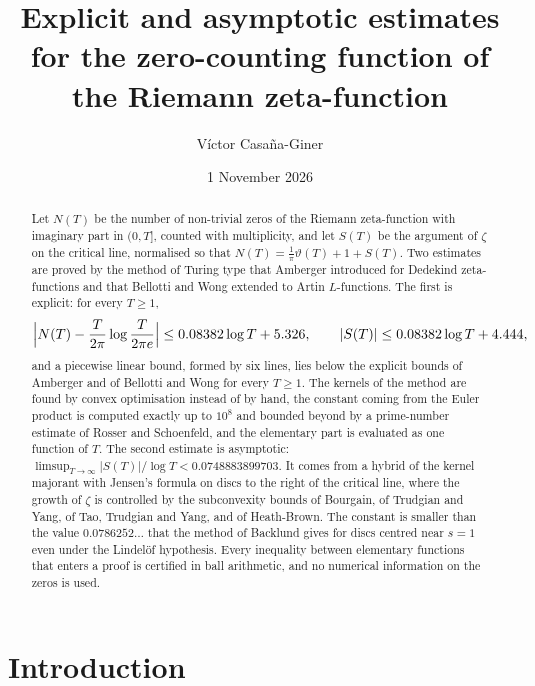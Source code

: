 \documentclass[11pt,reqno]{amsart}
\title[Explicit and asymptotic estimates for $N(T)$]{Explicit and asymptotic estimates for the zero-counting function of the Riemann zeta-function}
\author{V\'ictor Casa\~na-Giner}
\date{1 November 2026}
\numberwithin{equation}{section}
\theoremstyle{definition}
\theoremstyle{remark}
\newcommand{\LineBAone}{0.08382}
\newcommand{\LineBAthreeN}{5.326}
\newcommand{\LineBAthreeS}{4.444}
\newcommand{\CHup}{0.0748883899703}
\begin{document}
\begin{abstract}
Let $N(T)$ be the number of non-trivial zeros of the Riemann zeta-function with imaginary part in $(0,T]$, counted with multiplicity, and let $S(T)$ be the argument of $\zeta$ on the critical line, normalised so that $N(T)=\frac1\pi\vartheta(T)+1+S(T)$. Two estimates are proved by the method of Turing type that Amberger introduced for Dedekind zeta-functions and that Bellotti and Wong extended to Artin $L$-functions. The first is explicit: for every $T\ge1$,
\[
\Bigl|N(T)-\frac T{2\pi}\log\frac T{2\pi e}\Bigr|\le\LineBAone\log T+\LineBAthreeN,\qquad |S(T)|\le\LineBAone\log T+\LineBAthreeS,
\]
and a piecewise linear bound, formed by six lines, lies below the explicit bounds of Amberger and of Bellotti and Wong for every $T\ge1$. The kernels of the method are found by convex optimisation instead of by hand, the constant coming from the Euler product is computed exactly up to $10^8$ and bounded beyond by a prime-number estimate of Rosser and Schoenfeld, and the elementary part is evaluated as one function of $T$. The second estimate is asymptotic: $\limsup_{T\to\infty}|S(T)|/\log T<\CHup$. It comes from a hybrid of the kernel majorant with Jensen's formula on discs to the right of the critical line, where the growth of $\zeta$ is controlled by the subconvexity bounds of Bourgain, of Trudgian and Yang, of Tao, Trudgian and Yang, and of Heath-Brown. The constant is smaller than the value $0.0786252\ldots$ that the method of Backlund gives for discs centred near $s=1$ even under the Lindel\"of hypothesis. Every inequality between elementary functions that enters a proof is certified in ball arithmetic, and no numerical information on the zeros is used.
\end{abstract}

\maketitle
\tableofcontents

\section{Introduction}\label{sec:intro}
\end{document}
